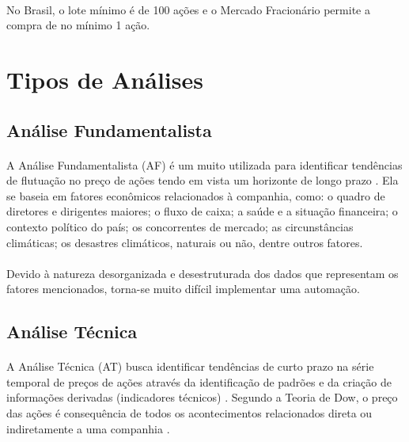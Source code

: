 \paragraph{} No Brasil, o lote mínimo é de 100 ações e o Mercado Fracionário permite a compra de no mínimo 1 ação.



\section{Tipos de Análises}



\subsection{Análise Fundamentalista}
\label{subsection:af}

\paragraph{} A Análise Fundamentalista (AF) é um muito utilizada para identificar tendências de flutuação no preço de ações tendo em vista um horizonte de longo prazo \cite{bulkowski2012fundamental}. Ela se baseia em fatores econômicos relacionados à companhia, como: o quadro de diretores e dirigentes maiores; o fluxo de caixa; a saúde e a situação financeira; o contexto político do país; os concorrentes de mercado; as circunstâncias climáticas; os desastres climáticos, naturais ou não, dentre outros fatores.

\paragraph{} Devido à natureza desorganizada e desestruturada dos dados que representam os fatores mencionados, torna-se muito difícil implementar uma automação.




\subsection{Análise Técnica}
\label{subsection:at}

\paragraph{} A Análise Técnica (AT) busca identificar tendências de curto prazo na série temporal de preços de ações através da identificação de padrões e da criação de informações derivadas (indicadores técnicos) \cite{murphy1999technical, edwards2018technical}. Segundo a Teoria de Dow, o preço das ações é consequência de todos os acontecimentos relacionados direta ou indiretamente a uma companhia \cite{kirkpatrick2010technical}.

